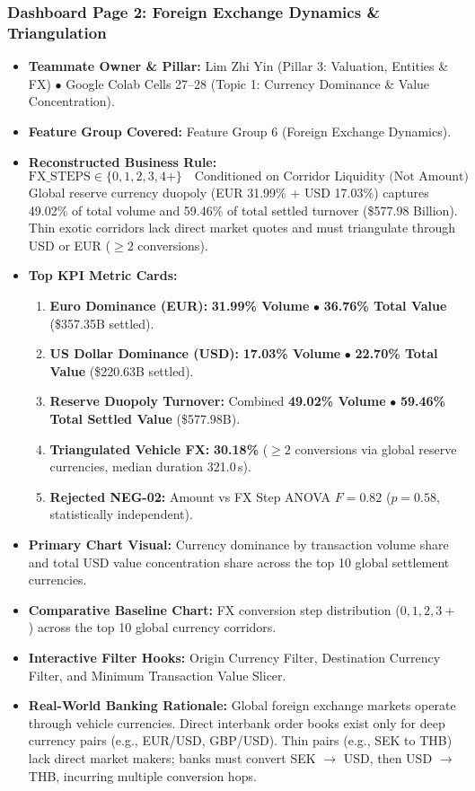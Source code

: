 \documentclass[11pt,a4paper]{article}
\begin{document}
\subsubsection{Dashboard Page 2: Foreign Exchange Dynamics \& Triangulation}
\begin{itemize}
    \item \textbf{Teammate Owner \& Pillar:} Lim Zhi Yin (Pillar 3: Valuation, Entities \& FX) $\bullet$ Google Colab Cells 27--28 (Topic 1: Currency Dominance \& Value Concentration).
    \item \textbf{Feature Group Covered:} Feature Group 6 (Foreign Exchange Dynamics).
    \item \textbf{Reconstructed Business Rule:}
    \begin{equation}
    \text{FX\_STEPS} \in \{0, 1, 2, 3, 4+\} \quad \text{Conditioned on Corridor Liquidity (Not Amount)}
    \end{equation}
    Global reserve currency duopoly (EUR 31.99\% + USD 17.03\%) captures 49.02\% of total volume and 59.46\% of total settled turnover (\$577.98 Billion). Thin exotic corridors lack direct market quotes and must triangulate through USD or EUR ($\ge 2$ conversions).
    \item \textbf{Top KPI Metric Cards:}
    \begin{enumerate}
        \item \textbf{Euro Dominance (EUR):} \textbf{31.99\% Volume} $\bullet$ \textbf{36.76\% Total Value} (\$357.35B settled).
        \item \textbf{US Dollar Dominance (USD):} \textbf{17.03\% Volume} $\bullet$ \textbf{22.70\% Total Value} (\$220.63B settled).
        \item \textbf{Reserve Duopoly Turnover:} Combined \textbf{49.02\% Volume} $\bullet$ \textbf{59.46\% Total Settled Value} (\$577.98B).
        \item \textbf{Triangulated Vehicle FX:} \textbf{30.18\%} ($\ge 2$ conversions via global reserve currencies, median duration 321.0\,s).
        \item \textbf{Rejected NEG-02:} Amount vs FX Step ANOVA $F=0.82$ ($p=0.58$, statistically independent).
    \end{enumerate}
    \item \textbf{Primary Chart Visual:} Currency dominance by transaction volume share and total USD value concentration share across the top 10 global settlement currencies.
    \item \textbf{Comparative Baseline Chart:} FX conversion step distribution ($0, 1, 2, 3+$) across the top 10 global currency corridors.
    \item \textbf{Interactive Filter Hooks:} Origin Currency Filter, Destination Currency Filter, and Minimum Transaction Value Slicer.
    \item \textbf{Real-World Banking Rationale:} Global foreign exchange markets operate through vehicle currencies. Direct interbank order books exist only for deep currency pairs (e.g., EUR/USD, GBP/USD). Thin pairs (e.g., SEK to THB) lack direct market makers; banks must convert SEK $\to$ USD, then USD $\to$ THB, incurring multiple conversion hops.
\end{itemize}
\end{document}
